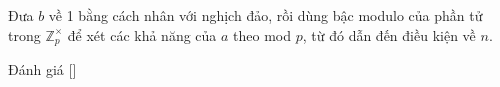 \ifshowhint
\begin{hint*}
    Đưa \( b \) về 1 bằng cách nhân với nghịch đảo, rồi dùng bậc modulo của phần tử trong \( \mathbb{Z}_p^\times \)
    để xét các khả năng của \( a \) theo mod \( p \), từ đó dẫn đến điều kiện về \( n \).
\end{hint*}
\fi

\ifshowinfo
\begin{remark*}
    Đánh giá [\textbf{}]
\end{remark*}
\newpage
\fi
